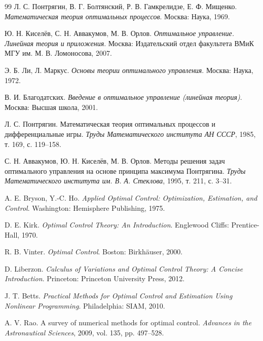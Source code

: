 \documentclass[a4paper,12pt]{article}
\begin{document}
{\sloppy\raggedright
\begin{thebibliography}{99}
Л. С. Понтрягин, В. Г. Болтянский, Р. В. Гамкрелидзе, Е. Ф. Мищенко.
\newblock \emph{Математическая теория оптимальных процессов}.
\newblock Москва: Наука, 1969.

Ю. Н. Киселёв, С. Н. Аввакумов, М. В. Орлов.
\newblock \emph{Оптимальное управление. Линейная теория и приложения}.
\newblock Москва: Издательский отдел факультета ВМиК МГУ им. М. В. Ломоносова, 2007.

Э. Б. Ли, Л. Маркус.
\newblock \emph{Основы теории оптимального управления}.
\newblock Москва: Наука, 1972.

В. И. Благодатских.
\newblock \emph{Введение в оптимальное управление (линейная теория)}.
\newblock Москва: Высшая школа, 2001.

Л. С. Понтрягин.
\newblock Математическая теория оптимальных процессов и дифференциальные игры.
\newblock \emph{Труды Математического института АН СССР}, 1985, т. 169, с. 119--158.

С. Н. Аввакумов, Ю. Н. Киселёв, М. В. Орлов.
\newblock Методы решения задач оптимального управления на основе принципа максимума Понтрягина.
\newblock \emph{Труды Математического института им. В. А. Стеклова}, 1995, т. 211, с. 3--31.

A. E. Bryson, Y.-C. Ho.
\newblock \emph{Applied Optimal Control: Optimization, Estimation, and Control}.
\newblock Washington: Hemisphere Publishing, 1975.

D. E. Kirk.
\newblock \emph{Optimal Control Theory: An Introduction}.
\newblock Englewood Cliffs: Prentice-Hall, 1970.

R. B. Vinter.
\newblock \emph{Optimal Control}.
\newblock Boston: Birkhäuser, 2000.

D. Liberzon.
\newblock \emph{Calculus of Variations and Optimal Control Theory: A Concise Introduction}.
\newblock Princeton: Princeton University Press, 2012.

J. T. Betts.
\newblock \emph{Practical Methods for Optimal Control and Estimation Using Nonlinear Programming}.
\newblock Philadelphia: SIAM, 2010.

A. V. Rao.
\newblock A survey of numerical methods for optimal control.
\newblock \emph{Advances in the Astronautical Sciences}, 2009, vol. 135, pp. 497--528.


\end{thebibliography}}
\end{document}
